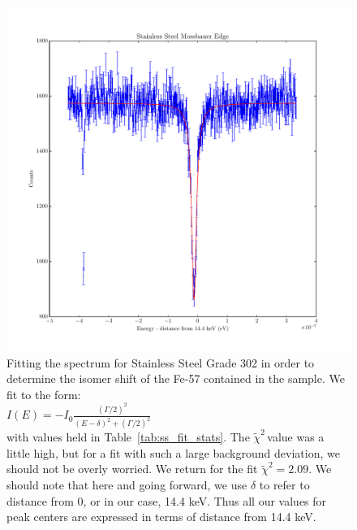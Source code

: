 \documentclass[reprint, nobibnotes, amssymb, amsmath, amsfonts, mathtools, mathrsfs, floatfix]{revtex4-1}
\newcommand{\redchi}{$\tilde{\chi}^2\,$}
\begin{document}
\begin{widetext}
      \begin{figure}[h]
        \centering
        \includegraphics[width=\linewidth]{../plots/ss_fit.pdf}
        \caption{
          Fitting the spectrum for Stainless Steel Grade 302 in order to determine the isomer shift of the Fe-57 contained in the sample.  We fit to the form: \\
            $I(E) = -I_0 \frac{(\Gamma/2)^2}{(E - \delta)^2 + (\Gamma/2)^2}$ \\
          with values held in Table~\ref{tab:ss_fit_stats}.  The \redchi value was a little high, but for a fit with such a large background deviation, we should not be overly worried.  We return for the fit $\tilde{\chi}^2 = 2.09$.  We should note that here and going forward, we use $\delta$ to refer to distance from 0, or in our case, 14.4 keV.  Thus all our values for peak centers are expressed in terms of distance from 14.4 keV.
          ~\label{ss_fit}
        }
      \end{figure}


\end{widetext}
\end{document}
